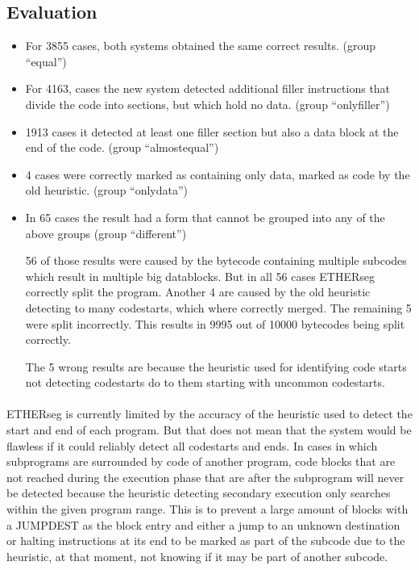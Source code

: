 \documentclass{article}
\begin{document}
\subsection{Evaluation}
\label{eval}
\begin{itemize}
    \item For 3855 cases, both systems obtained the same correct results. (group ``equal'')
    \item For 4163, cases the new system detected additional filler instructions that divide the code into sections, but which hold no data. (group ``onlyfiller'')
    \item 1913 cases it detected at least one filler section but also a data block at the end of the code. (group ``almostequal'')
    \item 4 cases were correctly marked as containing only data, marked as code by the old heuristic. (group ``onlydata'')
    \item In 65 cases the result had a form that cannot be grouped into any of the above groups (group ``different'')

    56 of those results were caused by the bytecode containing multiple subcodes which result in multiple big datablocks. But in all 56 cases ETHERseg correctly split the program. Another 4 are caused by the old heuristic detecting to many codestarts, which where correctly merged. The remaining 5 were split incorrectly.
    This results in 9995 out of 10000 bytecodes being split correctly.


    The 5 wrong results are because the heuristic used for identifying code starts not detecting codestarts do to them starting with uncommon codestarts.
\end{itemize}
\paragraph{}
    ETHERseg is currently limited by the accuracy of the heuristic used to detect the start and end of each program. But that does not mean that the system would be flawless if it could reliably detect all codestarts and ends. In cases in which subprograms are surrounded by code of another program, code blocks that are not reached during the execution phase that are after the subprogram will never be detected because the heuristic detecting secondary execution only searches within the given program range. This is to prevent a large amount of blocks with a JUMPDEST as the block entry and either a jump to an unknown destination or halting instructions at its end to be marked as part of the subcode due to the heuristic, at that moment, not knowing if it may be part of another subcode.
\end{document}
